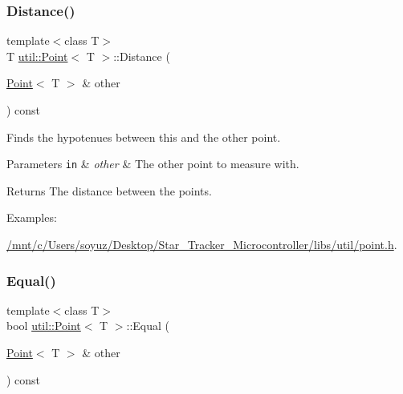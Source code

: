 \subsubsection{\texorpdfstring{Distance()}{Distance()}}
{\footnotesize\ttfamily template$<$class T$>$ \\
T \hyperlink{classutil_1_1Point}{util\+::\+Point}$<$ T $>$\+::Distance (\begin{DoxyParamCaption}\item[{\hyperlink{classutil_1_1Point}{Point}$<$ T $>$ \&}]{other }\end{DoxyParamCaption}) const\hspace{0.3cm}{\ttfamily [inline]}}



Finds the hypotenues between this and the other point. 


\begin{DoxyParams}[1]{Parameters}
\mbox{\tt in}  & {\em other} & The other point to measure with. \\
\hline
\end{DoxyParams}
\begin{DoxyReturn}{Returns}
The distance between the points. 
\end{DoxyReturn}
\begin{Desc}
\item[Examples\+: ]\par
\hyperlink{_2mnt_2c_2Users_2soyuz_2Desktop_2Star_Tracker_Microcontroller_2libs_2util_2point_8h-example}{/mnt/c/\+Users/soyuz/\+Desktop/\+Star\+\_\+\+Tracker\+\_\+\+Microcontroller/libs/util/point.\+h}.\end{Desc}
\mbox{\label{classutil_1_1Point_a1f0490a8d366dccc9e09ac5217c74f50}} 
\subsubsection{\texorpdfstring{Equal()}{Equal()}\hspace{0.1cm}{\footnotesize\ttfamily [1/2]}}
{\footnotesize\ttfamily template$<$class T$>$ \\
bool \hyperlink{classutil_1_1Point}{util\+::\+Point}$<$ T $>$\+::Equal (\begin{DoxyParamCaption}\item[{\hyperlink{classutil_1_1Point}{Point}$<$ T $>$ \&}]{other }\end{DoxyParamCaption}) const\hspace{0.3cm}{\ttfamily [inline]}}



